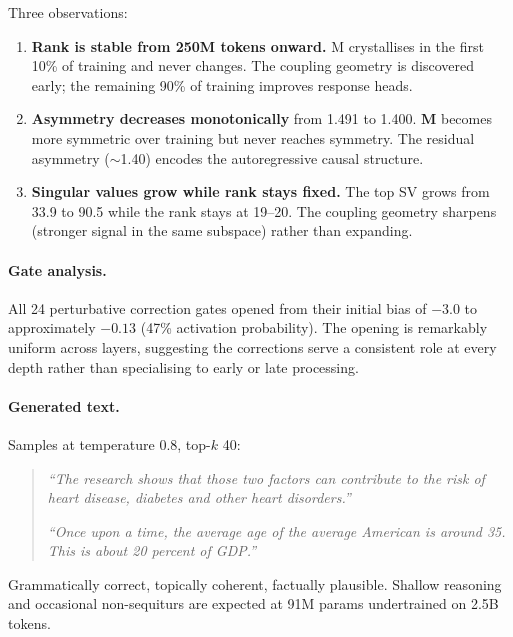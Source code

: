 \documentclass[11pt, a4paper]{article}
\newcommand{\M}{\mathbf{M}}
\theoremstyle{remark}
\begin{document}
Three observations:
\begin{enumerate}[nosep]
    \item \textbf{Rank is stable from 250M tokens onward.}  M crystallises in the first 10\% of training and never changes.  The coupling geometry is discovered early; the remaining 90\% of training improves response heads.
    \item \textbf{Asymmetry decreases monotonically} from 1.491 to 1.400.  $\M$ becomes more symmetric over training but never reaches symmetry.  The residual asymmetry ($\sim$1.40) encodes the autoregressive causal structure.
    \item \textbf{Singular values grow while rank stays fixed.}  The top SV grows from 33.9 to 90.5 while the rank stays at 19--20.  The coupling geometry sharpens (stronger signal in the same subspace) rather than expanding.
\end{enumerate}

\paragraph{Gate analysis.}
All 24 perturbative correction gates opened from their initial bias of $-3.0$ to approximately $-0.13$ (47\% activation probability).
The opening is remarkably uniform across layers, suggesting the corrections serve a consistent role at every depth rather than specialising to early or late processing.

\paragraph{Generated text.}
Samples at temperature 0.8, top-$k$ 40:
\begin{quote}\small
\textit{``The research shows that those two factors can contribute to the risk of heart disease, diabetes and other heart disorders.''}

\textit{``Once upon a time, the average age of the average American is around 35. This is about 20 percent of GDP.''}
\end{quote}
Grammatically correct, topically coherent, factually plausible.
Shallow reasoning and occasional non-sequiturs are expected at 91M params undertrained on 2.5B tokens.
\end{document}

